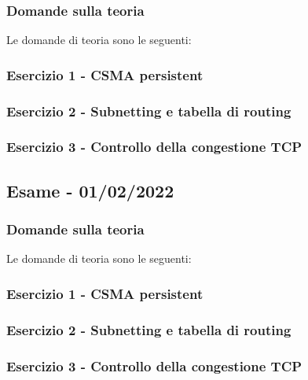 \documentclass[a4paper]{article}
\begin{document}
	\subsubsection{Domande sulla teoria}
	Le domande di teoria sono le seguenti:
	
	\subsubsection{Esercizio 1 - CSMA persistent}
	
	\subsubsection{Esercizio 2 - Subnetting e tabella di routing}
	
	\subsubsection{Esercizio 3 - Controllo della congestione TCP}
	
	\newpage

	\subsection[\textbf{Esame - 01/02/2022}]{Esame - 01/02/2022}
	
	\subsubsection{Domande sulla teoria}
	Le domande di teoria sono le seguenti:
	
	\subsubsection{Esercizio 1 - CSMA persistent}
	
	\subsubsection{Esercizio 2 - Subnetting e tabella di routing}
	
	\subsubsection{Esercizio 3 - Controllo della congestione TCP}
	
	\newpage
\end{document}
